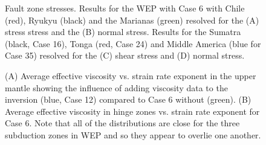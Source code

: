 \documentclass[12pt]{article}
\begin{document}
{\begin{figure}[H]
\centering
\hspace{-0.2cm}
\caption{
Fault zone stresses. Results for the WEP with Case 6 with Chile (red), Ryukyu (black) and the Marianas (green) resolved for  the
(A) stress stress and the
(B) normal stress. 
Results for the Sumatra (black, Case 16), Tonga (red, Case 24) and Middle America (blue for Case 35) resolved for the (C) shear stress
and (D) normal stress.}
\label{fig:shear_smaller}
\end{figure}



\begin{figure}[H]
\centering
\hspace{-0.2cm}
\caption{
(A) Average effective viscosity vs. strain rate exponent in the upper mantle showing the influence of adding viscosity data to the inversion (blue, Case 12) compared to Case 6 without (green). 
(B)  Average effective viscosity in hinge zones vs. strain rate exponent for  Case 6. Note that all of the distributions are close for the three subduction zones in WEP and so they appear to overlie one another.}
\label{fig:include_viscosity_hinge}
\end{figure}

}
\end{document}
